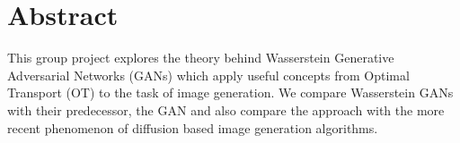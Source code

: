 
\begingroup
\let\clearpage\relax
\let\cleardoublepage\relax
\let\cleardoublepage\relax

\chapter*{Abstract}
This group project explores the theory behind Wasserstein Generative Adversarial Networks (GANs) which apply useful concepts from Optimal Transport (OT) to the task of image generation. We compare Wasserstein GANs with their predecessor, the GAN and also compare the approach with the more recent phenomenon of diffusion based image generation algorithms.



\endgroup			

\vfill


